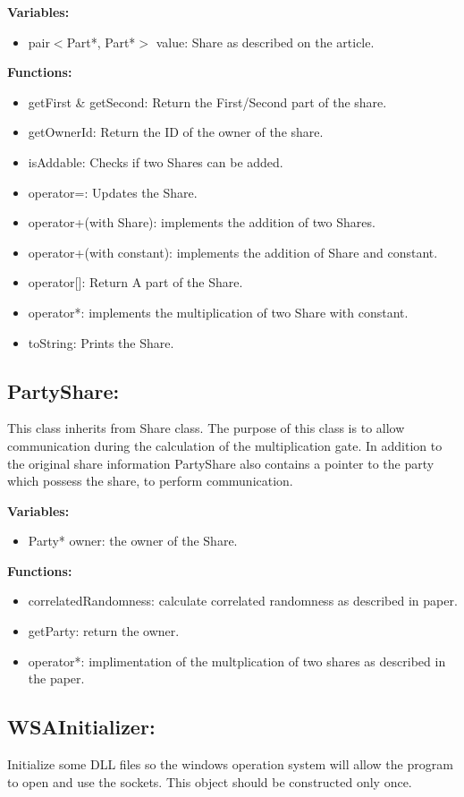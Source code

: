 \documentclass[12pt]{article}
\begin{document}
\textbf{Variables:}
\begin{itemize}
\item pair$<$Part*, Part*$>$ value: Share as described on the article.
\end{itemize}
\textbf{Functions:}
\begin{itemize}
	\item getFirst \& getSecond: Return the First/Second part of the share.
	\item getOwnerId: Return the ID of the owner of the share.
	\item isAddable: Checks if two Shares can be added.
	\item operator=: Updates the Share.
	\item operator+(with Share): implements the addition of two Shares.
	\item operator+(with constant): implements the addition of Share and constant.
	\item operator[]: Return A part of the Share.
	\item operator*: implements the multiplication of two Share with constant.
	\item toString: Prints the Share.
\end{itemize}
\subsection{PartyShare:}
This class inherits from Share class. The purpose of this class is to allow communication during the calculation of the multiplication gate. In addition to the original share information PartyShare also contains a pointer to the party which possess the share, to perform communication.\hfill\break

\textbf{Variables:}
\begin{itemize}
\item  Party* owner: the owner of the Share.
\end{itemize}
\textbf{Functions:}
\begin{itemize}
	\item correlatedRandomness: calculate correlated randomness as described in paper.
	\item getParty: return the owner.
	\item operator*: implimentation of the multplication of two shares as described in the paper.
\end{itemize}
\subsection{WSAInitializer:}
Initialize some DLL files so the windows operation system will allow the program to open and use the sockets. This object should be constructed only once.\hfill\break
\end{document}
